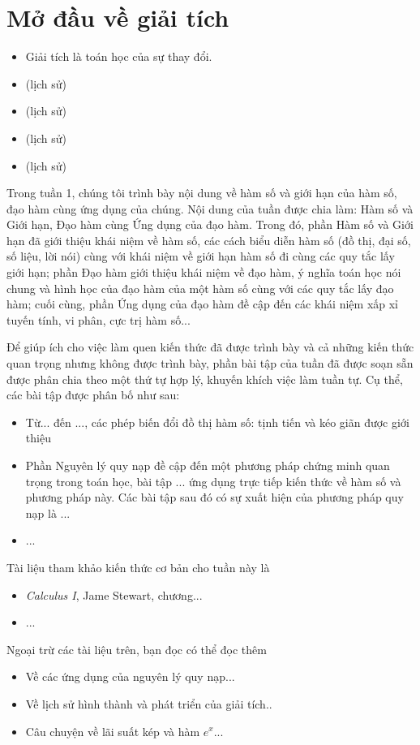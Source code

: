 \documentclass[a4paper,12pt]{book}
\begin{document}
\chapter{Mở đầu về giải tích}


\begin{itemize}
    \item Giải tích là toán học của sự thay đổi.

    \item (lịch sử)

    \item (lịch sử)

    \item (lịch sử)
    \item (lịch sử)

\end{itemize}
\noindent Trong tuần 1, chúng tôi trình bày nội dung về hàm số và giới hạn của hàm số, đạo hàm cùng ứng dụng của chúng.
\newpage
Nội dung của tuần được chia làm: Hàm số và Giới hạn, Đạo hàm cùng Ứng dụng của đạo hàm. Trong đó, phần Hàm số và Giới hạn đã giới thiệu khái niệm về hàm số, các cách biểu diễn hàm số (đồ thị, đại số, số liệu, lời nói) cùng với khái niệm về giới hạn hàm số đi cùng các quy tắc lấy giới hạn; phần Đạo hàm giới thiệu khái niệm về đạo hàm, ý nghĩa toán học nói chung và hình học của đạo hàm của một hàm số cùng với các quy tắc lấy đạo hàm; cuối cùng, phần Ứng dụng của đạo hàm đề cập đến các khái niệm xấp xỉ tuyến tính, vi phân, cực trị hàm số...

\vspace{5mm}
Để giúp ích cho việc làm quen kiến thức đã được trình bày và cả những kiến thức quan trọng nhưng không được trình bày, phần bài tập của tuần đã được soạn sẵn được phân chia theo một thứ tự hợp lý, khuyến khích việc làm tuần tự. Cụ thể, các bài tập được phân bố như sau:
\begin{itemize}
    \item Từ... đến ..., các phép biến đổi đồ thị hàm số: tịnh tiến và kéo giãn được giới thiệu
    \item Phần Nguyên lý quy nạp đề cập đến một phương pháp chứng minh quan trọng trong toán học, bài tập ... ứng dụng trực tiếp kiến thức về hàm số và phương pháp này. Các bài tập sau đó có sự xuất hiện của phương pháp quy nạp là ...
    \item ...
\end{itemize}
Tài liệu tham khảo kiến thức cơ bản cho tuần này là
\begin{itemize}
    \item \emph{Calculus I}, Jame Stewart, chương...
    \item ...
\end{itemize}
Ngoại trừ các tài liệu trên, bạn đọc có thể đọc thêm 
\begin{itemize}
    \item Về các ứng dụng của nguyên lý quy nạp...
    \item Về lịch sử hình thành và phát triển của giải tích..
    \item Câu chuyện về lãi suất kép và hàm $e^x$...
\end{itemize}
\end{document}
